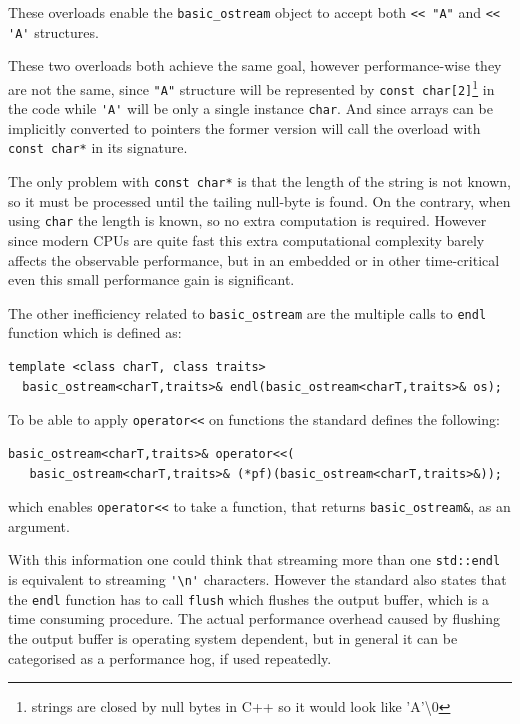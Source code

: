 These overloads enable the \verb|basic_ostream| object to accept both \verb|<< "A"| and \verb|<< 'A'| structures. \medskip
\par These two overloads both achieve the same goal, however performance-wise they are not the same, since \verb|"A"| structure will be represented by \verb|const char[2]|\footnote{strings are closed by null bytes in C++ so it would look like 'A'\textbackslash 0} in the code while \verb|'A'| will be only a single instance \verb|char|. And since arrays can be implicitly converted to pointers\cite[\S4.2]{cpp_standard} the former version will call the overload with \verb|const char*| in its signature.
\par The only problem with \verb|const char*| is that the length of the string is not known, so it must be processed until the tailing null-byte is found. On the contrary, when using \verb|char| the length is known, so no extra computation is required. However since modern CPUs are quite fast this extra computational complexity barely affects the observable performance, but in an embedded or in other time-critical even this small performance gain is significant. \medskip
\par The other inefficiency related to \verb|basic_ostream| are the multiple calls to \verb|endl| function which is defined as\cite[\S27.7.3.8]{cpp_standard}:
\begin{verbatim}
template <class charT, class traits>
  basic_ostream<charT,traits>& endl(basic_ostream<charT,traits>& os);
\end{verbatim}
To be able to apply \verb|operator<<| on functions the standard defines the following\cite[\S27.7.3.6]{cpp_standard}:
\begin{verbatim}
basic_ostream<charT,traits>& operator<<(
   basic_ostream<charT,traits>& (*pf)(basic_ostream<charT,traits>&));
\end{verbatim}
which enables \verb|operator<<| to take a function, that returns \verb|basic_ostream&|, as an argument. \medbreak
\par With this information one could think that streaming more than one \verb|std::endl| is equivalent to streaming \verb|'\n'| characters. However the standard also states that the \verb|endl| function has to call \verb|flush|\cite[\S27.7.3.8]{cpp_standard} which flushes the output buffer, which is a time consuming procedure. The actual performance overhead caused by flushing the output buffer is operating system dependent, but in general it can be categorised as a performance hog, if used repeatedly.
